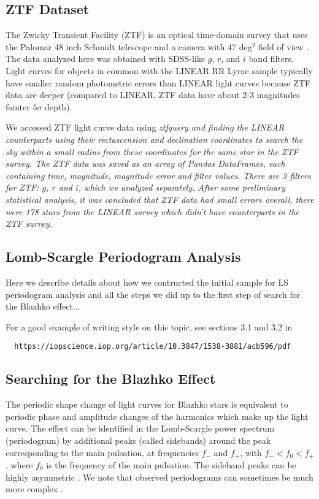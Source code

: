 \subsection{ZTF Dataset}

The Zwicky Transient Facility (ZTF) is an optical time-domain survey that uses the Palomar 48 inch Schmidt telescope
and a camera with 47 deg$^2$ field of view \citep{2019PASP..131a8002B}. The data analyzed here was obtained with
SDSS-like $g$, $r$, and $i$ band filters. Light curves for objects in common with the LINEAR RR Lyrae sample typically
have smaller random photometric errors than LINEAR light curves because ZTF data are deeper (compared to LINEAR,
ZTF data have about 2-3 magnitudes fainter  $5\sigma$ depth).

We accessed ZTF light curve data using \it{ztfquery} and finding the LINEAR counterparts using their rectascension and declination coordinates to search the sky within a small radius from these coordinates
for the same star in the ZTF survey. The ZTF data was saved as an array of Pandas DataFrames, each containing time, magnitude, magnitude error and filter values. There are 3 filters for ZTF: $g$, $r$ and $i$,
which we analyzed separately. After some preliminary statistical analysis, it was concluded that ZTF data had small errors overall, there were 178 stars from the LINEAR survey which didn't have counterparts
in the ZTF survey. 




\subsection{Lomb-Scargle Periodogram Analysis}

Here we describe details about how we contructed the initial sample for LS periodogram analysis and all the
steps we did up to the first step of search for the Blazhko effect... 

For a good example of writing style on this topic, see sections 3.1 and 3.2 in
\begin{verbatim}
  https://iopscience.iop.org/article/10.3847/1538-3881/acb596/pdf
\end{verbatim}

\subsection{Searching for the Blazhko Effect}

The periodic shape change of light curves for Blazhko stars is equivalent to periodic phase and amplitude changes of the
harmonics which make up the light curve. The effect can be identified in the Lomb-Scargle power spectrum (periodogram)
by additional peaks (called sidebands) around the peak corresponding to the main pulsation, at frequencies $f_-$ and $f_+$,
with $f_- < f_0 < f_+$, where $f_0$ is the frequency of the main pulsation. The sideband peaks can be highly asymmetric
\cite{2003ApJ...598..597A}. We note that observed periodograms can sometimes be much more complex \cite{2007MNRAS.377.1263S}. 

